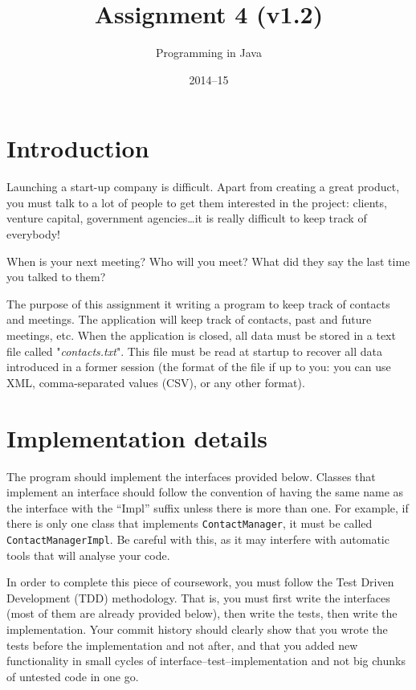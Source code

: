 \documentclass{article}
\author{Programming in Java}
\title{Assignment 4 (v1.2)}
\date{2014--15}
\begin{document}
\maketitle

\section{Introduction}
\label{sec:introduction}

Launching a start-up company is difficult. Apart from creating a great
product, you must talk to a lot of people to get them interested in
the project: clients, venture capital, government agencies\ldots it is
really difficult to keep track of everybody! 

When is your next meeting? Who will you meet? What did they say the
last time you talked to them?

The purpose of this assignment it writing a program to keep track of
contacts and meetings. The application will keep track of contacts,
past and future meetings, etc. When the application is closed, all
data must be stored in a text file called "\emph{contacts.txt}". This
file must be read at startup to recover all data introduced in a
former session (the format of the file if up to you: you can use XML,
comma-separated values (CSV), or any other format).

\section{Implementation details}
\label{sec:impl-deta}

The program should implement the interfaces
provided below. Classes that implement an interface should follow the
convention of having the same
name as the interface with the ``Impl'' suffix unless there is more 
than one. For
example, if there is only one class that implements
\verb+ContactManager+, it must be called \verb+ContactManagerImpl+. Be
careful with this, as it may interfere with automatic tools that will
analyse your code. 

In order to complete this piece of coursework, you must follow the
Test Driven Development (TDD) methodology. That is, you must first
write the interfaces (most of them are already provided below), then
write the tests, then write the implementation. Your commit history
should clearly show that you wrote the tests before the implementation
and not after, and that you added new functionality in small cycles of
interface--test--implementation and not big chunks of untested code in
one go. 
\end{document}
